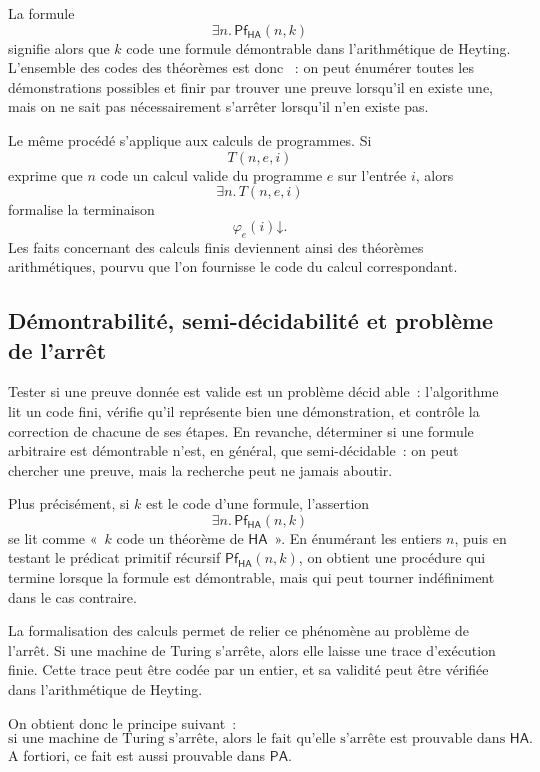 \thingy
La formule
\[
\exists n.\,\mathsf{Pf}_{\mathsf{HA}}(n,k)
\]
signifie alors que $k$ code une formule démontrable dans
l'arithmétique de Heyting.  L'ensemble des codes des théorèmes est donc
 : on peut énumérer toutes les démonstrations
possibles et finir par trouver une preuve lorsqu'il en existe une, mais
on ne sait pas nécessairement s'arrêter lorsqu'il n'en existe pas.

\thingy
Le même procédé s'applique aux calculs de programmes.  Si
\[
T(n,e,i)
\]
exprime que $n$ code un calcul valide du programme $e$ sur l'entrée $i$,
alors
\[
\exists n.\,T(n,e,i)
\]
formalise la terminaison
\[
\varphi_e(i)\mathord\downarrow.
\]
Les faits concernant des calculs finis deviennent ainsi des théorèmes
arithmétiques, pourvu que l'on fournisse le code du calcul correspondant.

\subsection{Démontrabilité, semi-décidabilité et problème de l'arrêt}

\thingy
Tester si une preuve donnée est valide est un problème décid able :
l'algorithme lit un code fini, vérifie qu'il représente bien une
démonstration, et contrôle la correction de chacune de ses étapes.  En
revanche, déterminer si une formule arbitraire est démontrable n'est, en
général, que semi-décidable : on peut chercher une preuve, mais la
recherche peut ne jamais aboutir.

\thingy
Plus précisément, si $k$ est le code d'une formule, l'assertion
\[
\exists n.\,\mathsf{Pf}_{\mathsf{HA}}(n,k)
\]
se lit comme « $k$ code un théorème de $\mathsf{HA}$ ».  En énumérant
les entiers $n$, puis en testant le prédicat primitif récursif
$\mathsf{Pf}_{\mathsf{HA}}(n,k)$, on obtient une procédure qui termine
lorsque la formule est démontrable, mais qui peut tourner indéfiniment
dans le cas contraire.

\thingy
La formalisation des calculs permet de relier ce phénomène au problème de
l'arrêt.  Si une machine de Turing s'arrête, alors elle laisse une trace
d'exécution finie.  Cette trace peut être codée par un entier, et sa
validité peut être vérifiée dans l'arithmétique de Heyting.

On obtient donc le principe suivant :
\[
\text{si une machine de Turing s'arrête, alors le fait qu'elle
s'arrête est prouvable dans $\mathsf{HA}$.}
\]
A fortiori, ce fait est aussi prouvable dans $\mathsf{PA}$.

